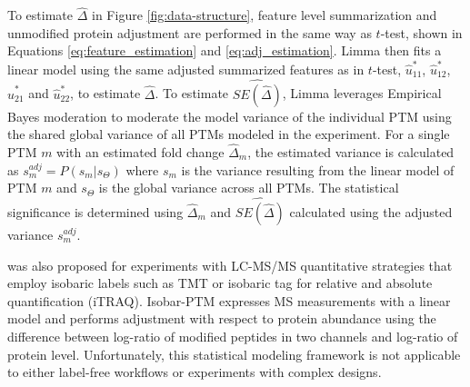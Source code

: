 \documentclass[mcp]{article}
\numberwithin{table}{section}
\begin{document}
To estimate $\hat{\Delta}$ in Figure \ref{fig:data-structure}, feature level summarization and unmodified protein adjustment are performed in the same way as $t$-test, shown in Equations \ref{eq:feature_estimation} and \ref{eq:adj_estimation}. Limma then fits a linear model using the same adjusted summarized features as in $t$-test, $\hat{u}^{\ast}_{11}$, $\hat{u}^{\ast}_{12}$, $\hat{u}^{\ast}_{21}$ and $\hat{u}^{\ast}_{22}$, to estimate $\hat{\Delta}$. To estimate $\widehat{SE(\hat{\Delta})}$, Limma leverages Empirical Bayes moderation to moderate the model variance of the individual PTM using the shared global variance of all PTMs modeled in the experiment. For a single PTM $m$ with an estimated fold change $\hat{\Delta}_m$, the estimated variance is calculated as $s^{adj}_{m} = P(s_{m}| s_\Theta)$ where $s_{m}$ is the variance resulting from the linear model of PTM $m$ and $s_\Theta$ is the global variance across all PTMs. The statistical significance is determined using $\hat{\Delta}_m$ and $\widehat{SE(\hat{\Delta})}$ calculated using the adjusted variance $s^{adj}_{m}$.



\medskip {} was also proposed for experiments with LC-MS/MS quantitative strategies that employ isobaric labels such as TMT or isobaric tag for relative and absolute quantification (iTRAQ)\cite{Breitwieser:2013}. Isobar-PTM expresses MS measurements with a linear model and performs adjustment with respect to protein abundance using the difference between log-ratio of modified peptides in two channels and log-ratio of protein level. Unfortunately, this statistical modeling framework is not applicable to either label-free workflows or experiments with complex designs. 
\end{document}
